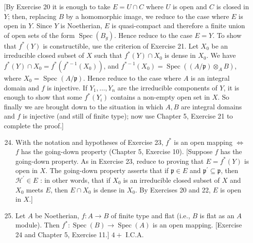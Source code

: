 \documentclass{standalone}
\theoremstyle{definition}
\theoremstyle{remark}
\begin{document}
[By Exercise 20 it is enough to take $E=U \cap C$ where $U$ is open and $C$ is closed in $Y$; then, replacing $B$ by a homomorphic image, we reduce to the case where $E$ is open in $Y$. Since $Y$ is Noetherian, $E$ is quasi-compact and therefore a finite union of open sets of the form $\operatorname{Spec}\left(B_{g}\right)$. Hence reduce to the case $E=Y$. To show that $f^{*}(Y)$ is constructible, use the criterion of Exercise 21. Let $X_{0}$ be an irreducible closed subset of $X$ such that $f^{*}(Y) \cap X_{0}$ is dense in $X_{0}$. We have $f^{*}(Y) \cap X_{0}=f^{*}\left(f^{*-1}\left(X_{0}\right)\right)$, and $f^{*-1}\left(X_{0}\right)=\operatorname{Spec}\left((A / \mathfrak{p}) \otimes_{A} B\right)$, where $X_{0}=$ Spec $(A / \mathfrak{p})$. Hence reduce to the case where $A$ is an integral domain and $f$ is injective. If $Y_{1}, \ldots, Y_{n}$ are the irreducible components of $Y$, it is enough to show that some $f^{*}\left(Y_{i}\right)$ contains a non-empty open set in $X$. So finally we are brought down to the situation in which $A, B$ are integral domains and $f$ is injective (and still of finite type); now use Chapter 5, Exercise 21 to complete the proof.]

\begin{enumerate}
  \setcounter{enumi}{23}
  \item With the notation and hypotheses of Exercise 23, $f^{*}$ is an open mapping $\Leftrightarrow$ $f$ has the going-down property (Chapter 5, Exercise 10). [Suppose $f$ has the going-down property. As in Exercise 23, reduce to proving that $E=f^{*}(Y)$ is open in $X$. The going-down property asserts that if $\mathfrak{p} \in E$ and $\mathfrak{p}^{\prime} \subseteq \mathfrak{p}$, then $\mathcal{H}^{\prime} \in E$ : in other words, that if $X_{0}$ is an irreducible closed subset of $X$ and $X_{0}$ meets $E$, then $E \cap X_{0}$ is dense in $X_{0}$. By Exercises 20 and 22, $E$ is open in $X$.]

  \item Let $A$ be Noetherian, $f: A \rightarrow B$ of finite type and flat (i.e., $B$ is flat as an $A$ module). Then $f^{*}: \operatorname{Spec}(B) \rightarrow \operatorname{Spec}(A)$ is an open mapping. [Exercise 24 and Chapter 5, Exercise 11.] $4+$ I.C.A.

\end{enumerate}
\end{document}
